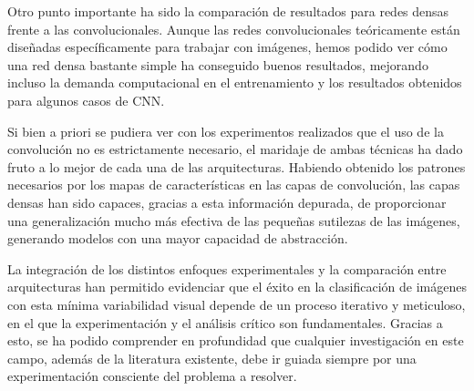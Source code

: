 \documentclass[a4paper,12pt]{article}
\begin{document}
Otro punto importante ha sido la comparación de resultados para redes densas frente a las convolucionales. Aunque las redes convolucionales teóricamente están diseñadas específicamente para trabajar con imágenes, hemos podido ver cómo una red densa bastante simple ha conseguido buenos resultados, mejorando incluso la demanda computacional en el entrenamiento y los resultados obtenidos para algunos casos de CNN.

Si bien a priori se pudiera ver con los experimentos realizados que el uso de la convolución no es estrictamente necesario, el maridaje de ambas técnicas ha dado fruto a lo mejor de cada una de las arquitecturas. Habiendo obtenido los patrones necesarios por los mapas de características en las capas de convolución, las capas densas han sido capaces, gracias a esta información depurada, de proporcionar una generalización mucho más efectiva de las pequeñas sutilezas de las imágenes, generando modelos con una mayor capacidad de abstracción.

La integración de los distintos enfoques experimentales y la comparación entre arquitecturas han permitido evidenciar que el éxito en la clasificación de imágenes con esta mínima variabilidad visual depende de un proceso iterativo y meticuloso, en el que la experimentación y el análisis crítico son fundamentales. Gracias a esto, se ha podido comprender en profundidad que cualquier investigación en este campo, además de la literatura existente, debe ir guiada siempre por una experimentación consciente del problema a resolver.



% 
% 
\end{document}
